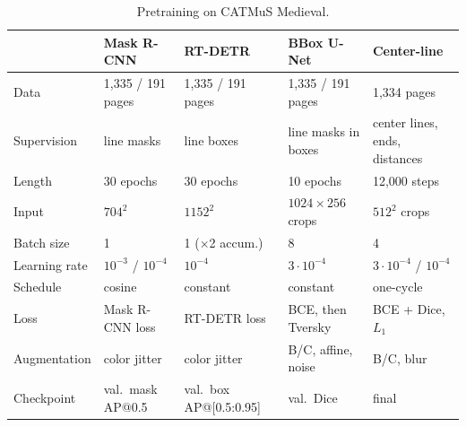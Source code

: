 \begin{table}[htbp]
    \centering
    \caption{Pretraining on CATMuS Medieval.}
    \label{tab:catmus-pretraining}
    \scriptsize
    \setlength{\tabcolsep}{3pt}
    \begin{tabular}{@{}lllll@{}}
        \toprule
        & Mask R-CNN & RT-DETR & BBox U-Net & Center-line \\
        \midrule
        Data & 1,335 / 191 pages & 1,335 / 191 pages & 1,335 / 191 pages & 1,334 pages \\
        Supervision & line masks & line boxes & line masks in boxes & center lines, ends, distances \\
        Length & 30 epochs & 30 epochs & 10 epochs & 12,000 steps \\
        Input & \(704^2\) & \(1152^2\) & \(1024\times256\) crops & \(512^2\) crops \\
        Batch size & 1 & 1 (\(\times\)2 accum.) & 8 & 4 \\
        Learning rate & \(10^{-3}\) / \(10^{-4}\) & \(10^{-4}\) & \(3\cdot10^{-4}\) & \(3\cdot10^{-4}\) / \(10^{-4}\) \\
        Schedule & cosine & constant & constant & one-cycle \\
        Loss & Mask R-CNN loss & RT-DETR loss & BCE, then Tversky & BCE + Dice, \(L_1\) \\
        Augmentation & color jitter & color jitter & B/C, affine, noise & B/C, blur \\
        Checkpoint & val.\ mask AP@0.5 & val.\ box AP@[0.5:0.95] & val.\ Dice & final \\
        \bottomrule
    \end{tabular}
    \par\smallskip
\end{table}

